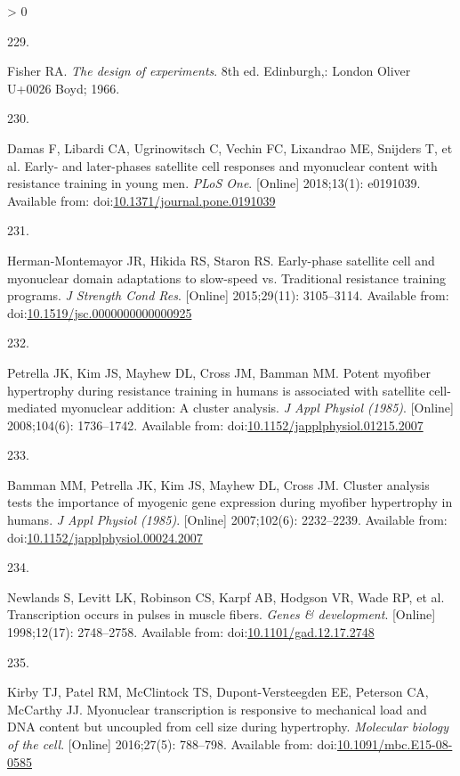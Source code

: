 \documentclass[twoside,10pt]{gihclass} %
\newlength{\cslhangindent}
\newlength{\csllabelwidth}
\newenvironment{CSLReferences}[3] %
 {%
  \setlength{\parindent}{0pt}
  \ifodd #1 \everypar{\setlength{\hangindent}{\cslhangindent}}\ignorespaces\fi
  \ifnum #2 > 0
  \setlength{\parskip}{#2\baselineskip}
  \fi
 }%
 {}
\newcommand{\CSLLeftMargin}[1]{\parbox[t]{\maxof{\widthof{#1}}{\csllabelwidth}}{#1}}
\newcommand{\CSLRightInline}[1]{\parbox[t]{\linewidth}{#1}}
\begin{document}
\begin{CSLReferences}{0}{0}
\leavevmode\hypertarget{ref-RN2004}{}%
\CSLLeftMargin{229. }
\CSLRightInline{Fisher RA. \emph{The design of experiments}. 8th ed. Edinburgh,: London Oliver U+0026 Boyd; 1966. }

\leavevmode\hypertarget{ref-RN2112}{}%
\CSLLeftMargin{230. }
\CSLRightInline{Damas F, Libardi CA, Ugrinowitsch C, Vechin FC, Lixandrao ME, Snijders T, et al. Early- and later-phases satellite cell responses and myonuclear content with resistance training in young men. \emph{PLoS One}. {[}Online{]} 2018;13(1): e0191039. Available from: doi:\href{https://doi.org/10.1371/journal.pone.0191039}{10.1371/journal.pone.0191039}}

\leavevmode\hypertarget{ref-RN2874}{}%
\CSLLeftMargin{231. }
\CSLRightInline{Herman-Montemayor JR, Hikida RS, Staron RS. Early-phase satellite cell and myonuclear domain adaptations to slow-speed vs. Traditional resistance training programs. \emph{J Strength Cond Res}. {[}Online{]} 2015;29(11): 3105--3114. Available from: doi:\href{https://doi.org/10.1519/jsc.0000000000000925}{10.1519/jsc.0000000000000925}}

\leavevmode\hypertarget{ref-RN2868}{}%
\CSLLeftMargin{232. }
\CSLRightInline{Petrella JK, Kim JS, Mayhew DL, Cross JM, Bamman MM. Potent myofiber hypertrophy during resistance training in humans is associated with satellite cell-mediated myonuclear addition: A cluster analysis. \emph{J Appl Physiol (1985)}. {[}Online{]} 2008;104(6): 1736--1742. Available from: doi:\href{https://doi.org/10.1152/japplphysiol.01215.2007}{10.1152/japplphysiol.01215.2007}}

\leavevmode\hypertarget{ref-RN765}{}%
\CSLLeftMargin{233. }
\CSLRightInline{Bamman MM, Petrella JK, Kim JS, Mayhew DL, Cross JM. Cluster analysis tests the importance of myogenic gene expression during myofiber hypertrophy in humans. \emph{J Appl Physiol (1985)}. {[}Online{]} 2007;102(6): 2232--2239. Available from: doi:\href{https://doi.org/10.1152/japplphysiol.00024.2007}{10.1152/japplphysiol.00024.2007}}

\leavevmode\hypertarget{ref-RN2618}{}%
\CSLLeftMargin{234. }
\CSLRightInline{Newlands S, Levitt LK, Robinson CS, Karpf AB, Hodgson VR, Wade RP, et al. Transcription occurs in pulses in muscle fibers. \emph{Genes \& development}. {[}Online{]} 1998;12(17): 2748--2758. Available from: doi:\href{https://doi.org/10.1101/gad.12.17.2748}{10.1101/gad.12.17.2748}}

\leavevmode\hypertarget{ref-RN2616}{}%
\CSLLeftMargin{235. }
\CSLRightInline{Kirby TJ, Patel RM, McClintock TS, Dupont-Versteegden EE, Peterson CA, McCarthy JJ. Myonuclear transcription is responsive to mechanical load and DNA content but uncoupled from cell size during hypertrophy. \emph{Molecular biology of the cell}. {[}Online{]} 2016;27(5): 788--798. Available from: doi:\href{https://doi.org/10.1091/mbc.E15-08-0585}{10.1091/mbc.E15-08-0585}}


\end{CSLReferences}
\end{document}
